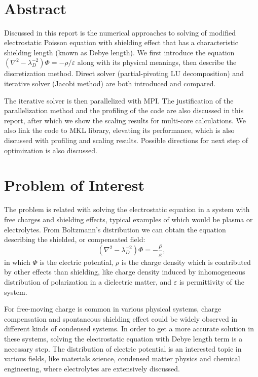 \documentclass{article}
\title{\vspace{2in}\textmd{\textbf{\hmwkClass}} \\
\vspace{0.1in}\large{ \hmwkClassTime}\vspace{3in}}
\author{\textbf{\hmwkAuthorName} \\ \vspace{0.1in}
\hmwkDueDate }
\date{} %
\begin{document}
\begin{spacing}{1.1}
\maketitle

\newpage
\section*{Abstract}


Discussed in this report is the numerical approaches to solving of modified electrostatic Poisson equation with shielding effect that has a characteristic shielding length (known as Debye length). We first introduce the equation $(\nabla^2 - \lambda_D^{-2})\Phi =-\rho / \varepsilon$ along with its physical meanings, then describe the discretization method. Direct solver (partial-pivoting LU decomposition) and iterative solver (Jacobi method) are both introduced and compared.

The iterative solver is then parallelized with MPI. The justification of the parallelization method and the profiling of the code are also discussed in this report, after which we show the scaling results for multi-core calculations. We also link the code to MKL library, elevating its performance, which is also discussed with profiling and scaling results. Possible directions for next step of optimization is also discussed.

\section{Problem of Interest}

The problem is related with solving the electrostatic equation in a system with free charges and shielding effects, typical examples of which would be plasma or electrolytes. From Boltzmann's distribution we can obtain the equation describing the shielded, or compensated field:
\[(\nabla^2 - \lambda_D^{-2})\Phi=-\frac{\rho}{\varepsilon},\]
in which $\Phi$ is the electric potential, $\rho$ is the charge density which is contributed by other effects than shielding, like charge density induced by inhomogeneous distribution of polarization in a dielectric matter, and $\varepsilon$ is permittivity of the system.

For free-moving charge is common in various physical systems, charge compensation and spontaneous shielding effect could be widely observed in different kinds of condensed systems. In order to get a more accurate solution in these systems, solving the electrostatic equation with Debye length term is a necessary step. The distribution of electric potential is an interested topic in various fields, like materials science, condensed matter physics and chemical engineering, where electrolytes are extensively discussed.


\end{spacing}
\end{document}
